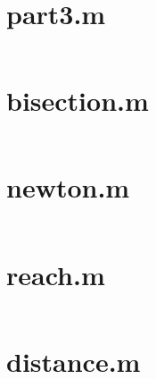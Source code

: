\documentclass[]{scrreprt}
\begin{document}
\begin{appendices}
\chapter{part3.m}
\inputminted[linenos=true,frame=leftline]{matlab}{roadster/part3.m}
\chapter{bisection.m}
\inputminted[linenos=true,frame=leftline]{matlab}{roadster/bisection.m}
\chapter{newton.m}
\inputminted[linenos=true,frame=leftline]{matlab}{roadster/newton.m}
\chapter{reach.m}
\inputminted[linenos=true,frame=leftline]{matlab}{roadster/reach.m}
\chapter{distance.m}
\inputminted[linenos=true,frame=leftline]{matlab}{roadster/distance.m}
\end{appendices}
\end{document}
